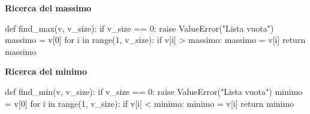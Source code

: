 \noindent\hspace*{2mm}%
\begin{minipage}[t]{\dimexpr\linewidth/2-4mm\relax}
\vspace{0pt}
\textbf{Ricerca del massimo}
\begin{unipdcode}[language=Python,
  basicstyle=\ttfamily\scriptsize,
  numbers=none,
  xleftmargin=0pt,
  xrightmargin=0pt,
  framexleftmargin=0.3em]
def find_max(v, v_size):
    if v_size == 0:
        raise ValueError("Lista vuota")
    massimo = v[0]
    for i in range(1, v_size):
        if v[i] > massimo:
            massimo = v[i]
    return massimo
\end{unipdcode}
\end{minipage}%
\hspace*{4mm}%
\begin{minipage}[t]{\dimexpr\linewidth/2-4mm\relax}
\vspace{0pt}
\textbf{Ricerca del minimo}
\begin{unipdcode}[language=Python,
  basicstyle=\ttfamily\scriptsize,
  numbers=none,
  xleftmargin=0pt,
  xrightmargin=0pt,
  framexleftmargin=0.3em]
def find_min(v, v_size):
    if v_size == 0:
        raise ValueError("Lista vuota")
    minimo = v[0]
    for i in range(1, v_size):
        if v[i] < minimo:
            minimo = v[i]
    return minimo
\end{unipdcode}
\end{minipage}
